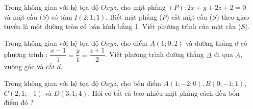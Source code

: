 \begin{vnmultiplechoice}[ rearrange=yes, keycolumns=5]
\begin{question} %
Trong không gian với hệ tọa độ $Oxyz$, cho  mặt
phẳng $(P):  2x+y+2z+2=0$  và mặt cầu ($S$) có tâm $I(2; 1; 1)$. Biết mặt phẳng ($P$) cắt mặt cầu ($S$) theo giao tuyến là
một đường tròn có bán kính bằng 1. Viết phương trình của mặt cầu ($S$).
\datcot
\bonpa
{}
{}
{}
{}
\end{question}

\begin{question} %
Trong không gian với hệ tọa độ $Oxyz$, cho điểm $A(1; 0; 2)$ và đường thẳng $d$ có
phương trình : $\dfrac{x-1}{1}=\dfrac{y}{1}=\dfrac{z+1}{2}$.
Viết phương trình đường thẳng $\Delta$ đi qua $A$, vuông
góc và cắt $d$.
\datcot[2]
\bonpa
{}
{}
{}
{}
\end{question}

\begin{question} %
Trong không gian với hệ tọa độ $Oxyz$, cho bốn điểm $A(1; -2; 0), B(0; -1; 1)$,
$C(2; 1; -1)$ và $D(3; 1; 4)$. Hỏi có tất cả bao nhiêu mặt phẳng cách đều bốn điểm đó ?
\datcot
\bonpa
{}
{}
{}
{}
\end{question}
 \end{vnmultiplechoice}
